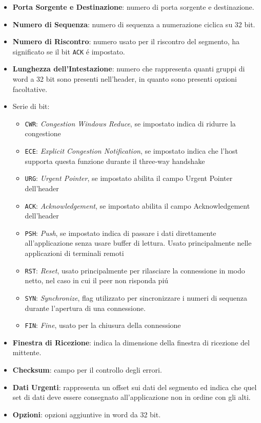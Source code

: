 \documentclass[12pt]{article}
\def\code#1{\texttt{#1}}
\begin{document}
\begin{itemize}[noitemsep]
    \item \textbf{Porta Sorgente e Destinazione}: numero di porta sorgente e destinazione.
    \item \textbf{Numero di Sequenza}: numero di sequenza a numerazione ciclica su 32 bit.
    \item \textbf{Numero di Riscontro}: numero usato per il riscontro del segmento, ha significato se il bit 
          \code{ACK} \'e impostato.
    \item \textbf{Lunghezza dell'Intestazione}: numero che rappresenta quanti gruppi di word a 32 bit sono presenti 
          nell'header, in quanto sono presenti opzioni facoltative.
    \item Serie di bit:
    \begin{itemize}[noitemsep]
        \item \code{CWR}: \textit{Congestion Windows Reduce}, se impostato indica di ridurre la congestione
        \item \code{ECE}: \textit{Explicit Congestion Notification}, se impostato indica che l'host supporta questa 
              funzione durante il three-way handshake      
        \item \code{URG}: \textit{Urgent Pointer}, se impostato abilita il campo Urgent Pointer dell'header
        \item \code{ACK}: \textit{Acknowledgement}, se impostato abilita il campo Acknowledgement dell'header
        \item \code{PSH}: \textit{Push}, se impostato indica di passare i dati direttamente all'applicazione
              senza usare buffer di lettura. Usato principalmente nelle applicazioni di terminali 
              remoti
        \item \code{RST}: \textit{Reset}, usato principalmente per rilasciare la connessione in modo netto,
              nel caso in cui il peer non risponda pi\'u
        \item \code{SYN}: \textit{Synchronize}, flag utilizzato per sincronizzare i numeri di sequenza durante
              l'apertura di una connessione. 
        \item \code{FIN}: \textit{Fine}, usato per la chiusura della connessione
    \end{itemize}
    \item \textbf{Finestra di Ricezione}: indica la dimensione della finestra di ricezione del mittente.
    \item \textbf{Checksum}: campo per il controllo degli errori.
    \item \textbf{Dati Urgenti}: rappresenta un offset sui dati del segmento ed indica che quel set di
          dati deve essere consegnato all'applicazione non in ordine con gli alti.
    \item \textbf{Opzioni}: opzioni aggiuntive in word da 32 bit.
\end{itemize}
\end{document}
